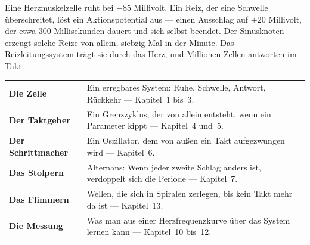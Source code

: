 \begin{merksatz}
Eine Herzmuskelzelle ruht bei $-85$ Millivolt. Ein Reiz, der eine Schwelle überschreitet, löst ein Aktionspotential aus --- einen Ausschlag auf $+20$ Millivolt, der etwa $300$ Millisekunden dauert und sich selbst beendet. Der Sinusknoten erzeugt solche Reize von allein, siebzig Mal in der Minute. Das Reizleitungssystem trägt sie durch das Herz, und Millionen Zellen antworten im Takt.

\begin{center}
{\small
\renewcommand{\arraystretch}{1.5}
\begin{tabular}{@{}P{3.0cm}P{5.8cm}@{}}
\toprule
\textbf{Die Zelle} & Ein erregbares System: Ruhe, Schwelle, Antwort, Rückkehr --- Kapitel~1 bis~3.\\
\textbf{Der Taktgeber} & Ein Grenzzyklus, der von allein entsteht, wenn ein Parameter kippt --- Kapitel~4 und~5.\\
\textbf{Der Schrittmacher} & Ein Oszillator, dem von außen ein Takt aufgezwungen wird --- Kapitel~6.\\
\textbf{Das Stolpern} & Alternans: Wenn jeder zweite Schlag anders ist, verdoppelt sich die Periode --- Kapitel~7.\\
\textbf{Das Flimmern} & Wellen, die sich in Spiralen zerlegen, bis kein Takt mehr da ist --- Kapitel~13.\\
\textbf{Die Messung} & Was man aus einer Herzfrequenzkurve über das System lernen kann --- Kapitel~10 bis~12.\\
\bottomrule
\end{tabular}}
\end{center}

\begin{center}
\begin{minipage}{0.88\textwidth}
\end{minipage}
\end{center}
\end{merksatz}

